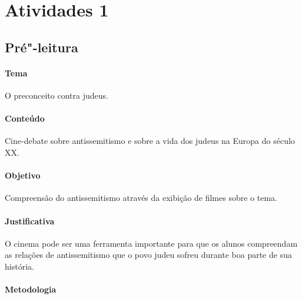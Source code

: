 \documentclass[12pt]{extarticle}
\begin{document}
\section{Atividades 1}


\subsection{Pré"-leitura}


\paragraph{Tema} O preconceito contra judeus. 

\paragraph{Conteúdo} Cine-debate sobre antissemitismo e sobre a vida dos judeus na Europa do século XX.

\paragraph{Objetivo} Compreensão do antissemitismo através da exibição de filmes sobre o tema.

\paragraph{Justificativa} O cinema pode ser uma ferramenta importante para que os alunos compreendam as relações de
antissemitismo que o povo judeu sofreu durante boa parte de sua
história.

\paragraph{Metodologia}
\end{document}
